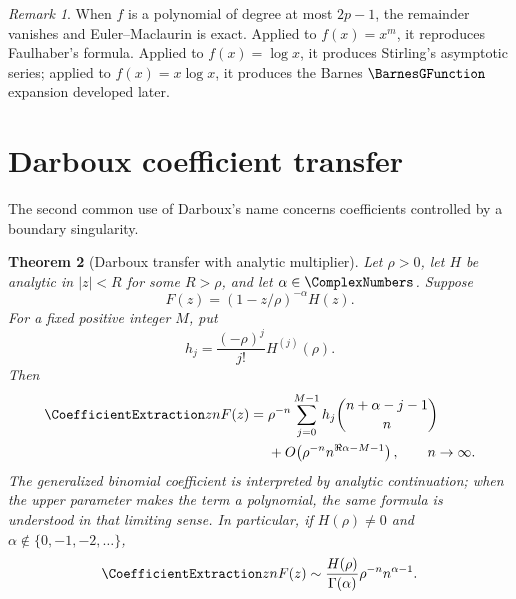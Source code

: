\documentclass[11pt,a4paper,oneside,openany]{book}
\newtheorem{theorem}{Theorem}[chapter]
\theoremstyle{definition}
\theoremstyle{remark}
\newtheorem{remark}[theorem]{Remark}
\begin{document}
\begin{remark}
When $f$ is a polynomial of degree at most $2p-1$, the remainder vanishes and
Euler--Maclaurin is exact.  Applied to $f(x)=x^m$, it reproduces Faulhaber's
formula.  Applied to $f(x)=\log x$, it produces Stirling's asymptotic series;
applied to $f(x)=x\log x$, it produces the Barnes $\BarnesGFunction$ expansion developed
later.
\end{remark}

\section{Darboux coefficient transfer}

The second common use of Darboux's name concerns coefficients controlled by a
boundary singularity.

\begin{theorem}[Darboux transfer with analytic multiplier]\label{thm:new-darboux-transfer}
Let $\rho>0$, let $H$ be analytic in $|z|<R$ for some $R>\rho$, and let
$\alpha\in\ComplexNumbers$.  Suppose
\[
 F(z)=(1-z/\rho)^{-\alpha}H(z).
\]
For a fixed positive integer $M$, put
\begin{equation}\label{eq:new-darboux-hj}
 h_j=\frac{(-\rho)^j}{j!}H^{(j)}(\rho).
\end{equation}
Then
\begin{align}
 \CoefficientExtraction z nF(z)
={}&\rho^{-n}\sum_{j=0}^{M-1}h_j
 \binom{n+\alpha-j-1}{n}
 \notag\\
 &+O\!\left(\rho^{-n}n^{\Re\alpha-M-1}\right),
 \qquad n\to\infty.
 \label{eq:new-darboux-transfer}
\end{align}
The generalized binomial coefficient is interpreted by analytic continuation;
when the upper parameter makes the term a polynomial, the same formula is
understood in that limiting sense.  In particular, if $H(\rho)\ne0$ and
$\alpha\notin\{0,-1,-2,\ldots\}$,
\begin{equation}\label{eq:new-darboux-leading}
 \CoefficientExtraction z nF(z)
 \sim\frac{H(\rho)}{\Gamma(\alpha)}\rho^{-n}n^{\alpha-1}.
\end{equation}
\end{theorem}
\end{document}

